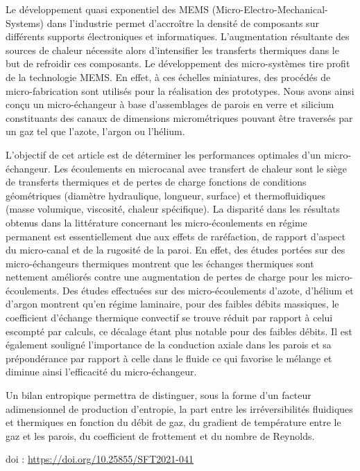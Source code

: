 {\normalsize
Le développement quasi exponentiel des MEMS (Micro-Electro-Mechanical-Systems) dans l'industrie permet d'accroître la densité de composants sur différents supports électroniques et informatiques. L'augmentation résultante des sources de chaleur nécessite alors d'intensifier les transferts thermiques dans le but de refroidir ces composants. Le développement des micro-systèmes tire profit de la technologie MEMS. En effet, à ces échelles miniatures, des procédés de micro-fabrication sont utilisés pour la réalisation des prototypes. Nous avons ainsi conçu un micro-échangeur à base d'assemblages de parois en verre et silicium constituants des canaux de dimensions micrométriques pouvant être traversés par un gaz tel que l'azote, l'argon ou l'hélium.



L'objectif de cet article est de déterminer les performances optimales d'un micro-échangeur. Les écoulements en microcanal avec transfert de chaleur sont le siège de transferts thermiques et de pertes de charge fonctions de conditions géométriques (diamètre hydraulique, longueur, surface) et thermofluidiques (masse volumique, viscosité, chaleur spécifique). La disparité dans les résultats obtenus dans la littérature concernant les micro-écoulements en régime permanent est essentiellement due aux effets de raréfaction, de rapport d'aspect du micro-canal et de la rugosité de la paroi. En effet, des études portées sur des micro-échangeurs thermiques montrent que les échanges thermiques sont nettement améliorés contre une augmentation de pertes de charge pour les micro-écoulements. Des études effectuées sur des micro-écoulements d'azote, d'hélium et d'argon montrent qu'en régime laminaire, pour des faibles débits massiques, le coefficient d'échange thermique convectif se trouve réduit par rapport à celui escompté par calculs, ce décalage étant plus notable pour des faibles débits. Il est également souligné l'importance de la conduction axiale dans les parois et sa prépondérance par rapport à celle dans le fluide ce qui favorise le mélange et diminue ainsi l'efficacité du micro-échangeur. 



Un bilan entropique permettra de distinguer, sous la forme d'un facteur adimensionnel de production d'entropie, la part entre les irréversibilités fluidiques et thermiques en fonction du débit de gaz, du gradient de température entre le gaz et les parois, du coefficient de frottement et du nombre de Reynolds.

 \vfill doi : \url{https://doi.org/10.25855/SFT2021-041}

}
 
